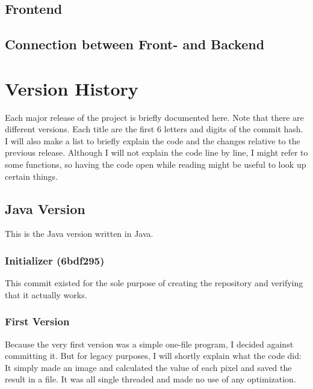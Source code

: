 \documentclass[10pt,a4paper,titlepage]{article}
\begin{document}
	\subsection{Frontend}
	\subsection{Connection between Front- and Backend}
	
	\section{Version History}
	Each major release of the project is briefly documented here. Note that there are different versions. Each title are the first 6 letters and digits of the commit hash. I will also make a list to briefly explain the code and the changes relative to the previous release. Although I will not explain the code line by line, I might refer to some functions, so having the code open while reading might be useful to look up certain things.
	\subsection{Java Version}
	This is the Java version written in Java.
	\subsubsection{Initializer (6bdf295)}
	This commit existed for the sole purpose of creating the repository and verifying that it actually works.
	\subsubsection{First Version}
	Because the very first version was a simple one-file program, I decided against committing it. But for legacy purposes, I will shortly explain what the code did: It simply made an image and calculated the value of each pixel and saved the result in a file. It was all single threaded and made no use of any optimization.
\end{document}
